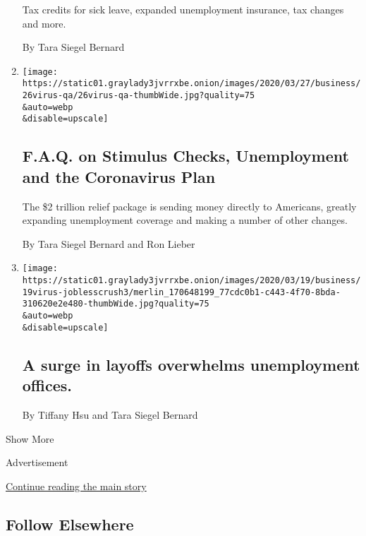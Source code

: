 \begin{enumerate}
  Tax credits for sick leave, expanded unemployment insurance, tax
  changes and more.

  By Tara Siegel Bernard
\item
  \href{/article/coronavirus-stimulus-package-questions-answers.html}{}

  \texttt{[image: https://static01.graylady3jvrrxbe.onion/images/2020/03/27/business/26virus-qa/26virus-qa-thumbWide.jpg?quality=75\\\&auto=webp\\\&disable=upscale]}

  \hypertarget{faq-on-stimulus-checks-unemployment-and-the-coronavirus-plan}{%
  \subsection{F.A.Q. on Stimulus Checks, Unemployment and the
  Coronavirus
  Plan}\label{faq-on-stimulus-checks-unemployment-and-the-coronavirus-plan}}

  The \$2 trillion relief package is sending money directly to
  Americans, greatly expanding unemployment coverage and making a number
  of other changes.

  By Tara Siegel Bernard and Ron Lieber
\item
  \href{/live/2020/covid-19-03-19/a-surge-in-layoffs-overwhelms-unemployment-offices}{}

  \texttt{[image: https://static01.graylady3jvrrxbe.onion/images/2020/03/19/business/19virus-joblesscrush3/merlin\_170648199\_77cdc0b1-c443-4f70-8bda-310620e2e480-thumbWide.jpg?quality=75\\\&auto=webp\\\&disable=upscale]}

  \hypertarget{a-surge-in-layoffs-overwhelms-unemployment-offices}{%
  \subsection{A surge in layoffs overwhelms unemployment
  offices.}\label{a-surge-in-layoffs-overwhelms-unemployment-offices}}

  By Tiffany Hsu and Tara Siegel Bernard
\end{enumerate}

Show More

Advertisement

\protect\hyperlink{after-mid2}{Continue reading the main story}

\hypertarget{follow-elsewhere}{%
\subsection{Follow Elsewhere}\label{follow-elsewhere}}


